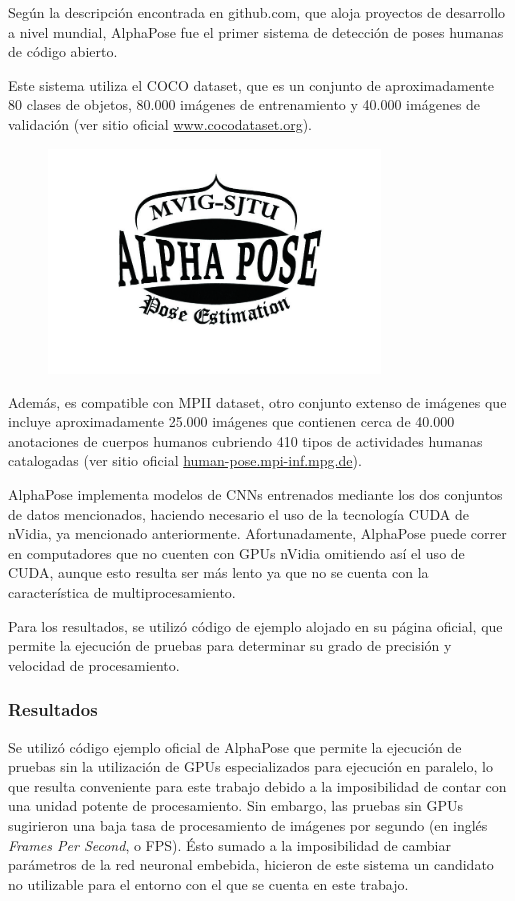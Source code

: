 \documentclass[a4paper,12pt,oneside,spanish]{book}
\begin{document}
Según la descripción encontrada en github.com, que aloja proyectos de desarrollo a nivel mundial, AlphaPose fue el primer sistema de detección de poses humanas de código abierto.\par

Este sistema utiliza el COCO dataset, que es un conjunto de aproximadamente 80 clases de objetos, 80.000 imágenes de entrenamiento y 40.000 imágenes de validación (ver sitio oficial \url{www.cocodataset.org}).\par

\begin{figure}[h!]
	\includegraphics[width=250pt]{Imagenes/alphapose.jpg}
	\centering	
	\label{fig:alphapose}
\end{figure}

Además, es compatible con MPII dataset, otro conjunto extenso de imágenes que incluye aproximadamente 25.000 imágenes que contienen cerca de 40.000 anotaciones de cuerpos humanos cubriendo 410 tipos de actividades humanas catalogadas (ver sitio oficial \url{human-pose.mpi-inf.mpg.de}).\par

AlphaPose implementa modelos de CNNs entrenados mediante los dos conjuntos de datos mencionados, haciendo necesario el uso de la tecnología CUDA de nVidia, ya mencionado anteriormente. Afortunadamente, AlphaPose puede correr en computadores que no cuenten con GPUs nVidia omitiendo así el uso de CUDA, aunque esto resulta ser más lento ya que no se cuenta con la característica de multiprocesamiento.\par

Para los resultados, se utilizó código de ejemplo alojado en su página oficial, que permite la ejecución de pruebas para determinar su grado de precisión y velocidad de procesamiento.\par

\subsubsection{Resultados}
Se utilizó código ejemplo oficial de AlphaPose que permite la ejecución de pruebas sin la utilización de GPUs especializados para ejecución en paralelo, lo que resulta conveniente para este trabajo debido a la imposibilidad de contar con una unidad potente de procesamiento. Sin embargo, las pruebas sin GPUs sugirieron una baja tasa de procesamiento de imágenes por segundo (en inglés \textit{Frames Per Second}, o FPS). Ésto sumado a la imposibilidad de cambiar parámetros de la red neuronal embebida, hicieron de este sistema un candidato no utilizable para el entorno con el que se cuenta en este trabajo.\par
\end{document}
